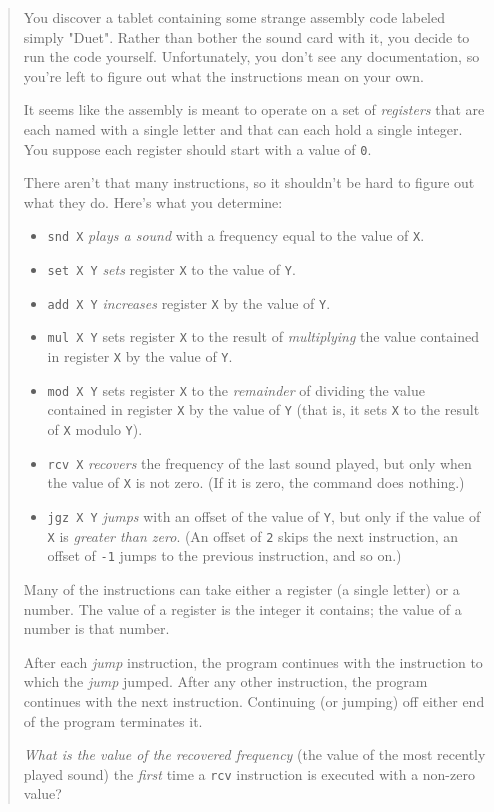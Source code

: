 \documentclass[]{article}
\begin{document}
\begin{quote}
You discover a tablet containing some strange assembly code labeled simply
"Duet". Rather than bother the sound card with it, you decide to run the code
yourself. Unfortunately, you don't see any documentation, so you're left to
figure out what the instructions mean on your own.

It seems like the assembly is meant to operate on a set of \emph{registers} that
are each named with a single letter and that can each hold a single integer. You
suppose each register should start with a value of \texttt{0}.

There aren't that many instructions, so it shouldn't be hard to figure out what
they do. Here's what you determine:

\begin{itemize}
\tightlist
\item
  \texttt{snd\ X} \emph{plays a sound} with a frequency equal to the value of
  \texttt{X}.
\item
  \texttt{set\ X\ Y} \emph{sets} register \texttt{X} to the value of \texttt{Y}.
\item
  \texttt{add\ X\ Y} \emph{increases} register \texttt{X} by the value of
  \texttt{Y}.
\item
  \texttt{mul\ X\ Y} sets register \texttt{X} to the result of
  \emph{multiplying} the value contained in register \texttt{X} by the value of
  \texttt{Y}.
\item
  \texttt{mod\ X\ Y} sets register \texttt{X} to the \emph{remainder} of
  dividing the value contained in register \texttt{X} by the value of \texttt{Y}
  (that is, it sets \texttt{X} to the result of \texttt{X} modulo \texttt{Y}).
\item
  \texttt{rcv\ X} \emph{recovers} the frequency of the last sound played, but
  only when the value of \texttt{X} is not zero. (If it is zero, the command
  does nothing.)
\item
  \texttt{jgz\ X\ Y} \emph{jumps} with an offset of the value of \texttt{Y}, but
  only if the value of \texttt{X} is \emph{greater than zero}. (An offset of
  \texttt{2} skips the next instruction, an offset of \texttt{-1} jumps to the
  previous instruction, and so on.)
\end{itemize}

Many of the instructions can take either a register (a single letter) or a
number. The value of a register is the integer it contains; the value of a
number is that number.

After each \emph{jump} instruction, the program continues with the instruction
to which the \emph{jump} jumped. After any other instruction, the program
continues with the next instruction. Continuing (or jumping) off either end of
the program terminates it.

\emph{What is the value of the recovered frequency} (the value of the most
recently played sound) the \emph{first} time a \texttt{rcv} instruction is
executed with a non-zero value?
\end{quote}
\end{document}
